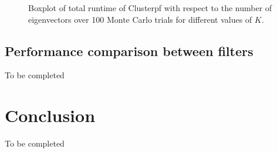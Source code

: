 \documentclass[10pt,letterpaper,final]{article}
\begin{document}
\begin{figure}
\centering
{}
\caption{Boxplot of total runtime of Clusterpf with respect to the number of eigenvectors over 100 Monte Carlo trials for different values of $K$.}
\label{fig:runtime_NbClusters}
\end{figure}

\subsection{Performance comparison between filters}
To be completed




\section{Conclusion}
\label{sec:conclusion}
To be completed
\end{document}
